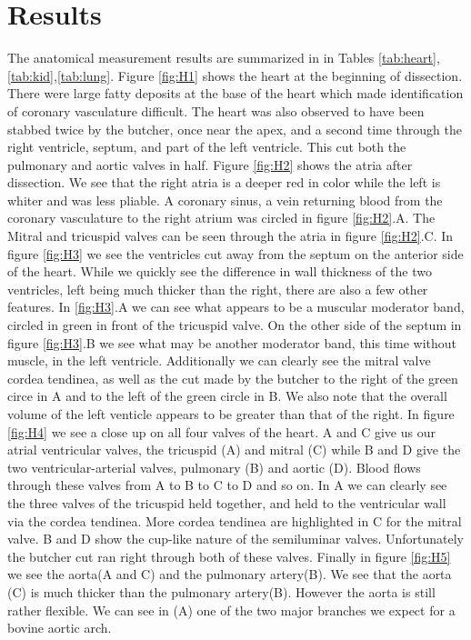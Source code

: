 \documentclass[12pt]{article}
\begin{document}
\section{Results}
\par{}
The anatomical measurement results are summarized in in Tables \ref{tab:heart},\ref{tab:kid},\ref{tab:lung}. Figure \ref{fig:H1} shows the heart at the beginning of dissection. There were large fatty deposits at the base of the heart which made identification of coronary vasculature difficult. The heart was also observed to have been stabbed twice by the butcher, once near the apex, and a second time through the right ventricle, septum, and part of the left ventricle. This cut both the pulmonary and aortic valves in half. Figure \ref{fig:H2} shows the atria after dissection. We see that the right atria is a deeper red in color while the left is whiter and was less pliable. A coronary sinus, a vein returning blood from the coronary vasculature to the right atrium was circled in figure \ref{fig:H2}.A. The Mitral and tricuspid valves can be seen through the atria in figure \ref{fig:H2}.C. In figure \ref{fig:H3} we see the ventricles cut away from the septum on the anterior side of the heart. While we quickly see the difference in wall thickness of the two ventricles, left being much thicker than the right, there are also a few other features. In \ref{fig:H3}.A we can see what appears to be a muscular moderator band, circled in green in front of the tricuspid valve. On the other side of the septum in figure \ref{fig:H3}.B we see what may be another moderator band, this time without muscle, in the left ventricle. Additionally we can clearly see the mitral valve cordea tendinea, as well as the cut made by the butcher to the right of the green circe in A and to the left of the green circle in B. We also note that the overall volume of the left venticle appears to be greater than that of the right. In figure \ref{fig:H4} we see a close up on all four valves of the heart. A and C give us our atrial ventricular valves, the tricuspid (A) and mitral (C) while B and D give the two ventricular-arterial valves, pulmonary (B) and aortic (D). Blood flows through these valves from A to B to C to D and so on. In A we can clearly see the three valves of the tricuspid held together, and held to the ventricular wall via the cordea tendinea. More cordea tendinea are highlighted in C for the mitral valve. B and D show the cup-like nature of the semiluminar valves. Unfortunately the butcher cut ran right through both of these valves. Finally in figure \ref{fig:H5} we see the aorta(A and C) and the pulmonary artery(B). We see that the aorta (C) is much thicker than the pulmonary artery(B). However the aorta is still rather flexible. We can see in (A) one of the two major branches we expect for a bovine aortic arch.
\end{document}
